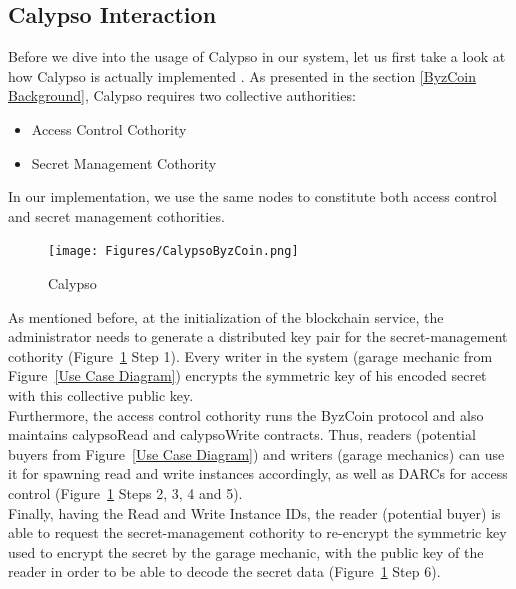 \subsection{Calypso Interaction}

Before we dive into the usage of Calypso in our system, let us first take a look at how Calypso is actually implemented \cite{Calypso Implementation}.
\newline
As presented in the section \ref{ByzCoin Background}, Calypso requires two collective authorities:
\begin{itemize}
    \item Access Control Cothority
    \item Secret Management Cothority
\end{itemize}
In our implementation, we use the same nodes to constitute both access control and secret management cothorities.\\
\newline
\begin{figure}[H]
    \centering
    \texttt{[image: Figures/CalypsoByzCoin.png]}
    \caption{Calypso \cite{Calypso Implementation}}
    \label{Calypso}
\end{figure}
\noindent
As mentioned before, at the initialization of the blockchain service, the administrator needs to generate a distributed key pair for the secret-management cothority (Figure~\ref{Calypso} Step 1). Every writer in the system (garage mechanic from Figure~\ref{Use Case Diagram}) encrypts the symmetric key of his encoded secret with this collective public key.\\
\newline
Furthermore, the access control cothority runs the ByzCoin protocol and also maintains calypsoRead and calypsoWrite contracts. Thus, readers (potential buyers from Figure~\ref{Use Case Diagram}) and writers (garage mechanics) can use it for spawning read and write instances accordingly, as well as DARCs for access control (Figure~\ref{Calypso} Steps 2, 3, 4 and 5).\\
\newline
Finally, having the Read and Write Instance IDs, the reader (potential buyer) is able to request the secret-management cothority to re-encrypt the symmetric key used to encrypt the secret by the garage mechanic, with the public key of the reader in order to be able to decode the secret data (Figure~\ref{Calypso} Step 6).

